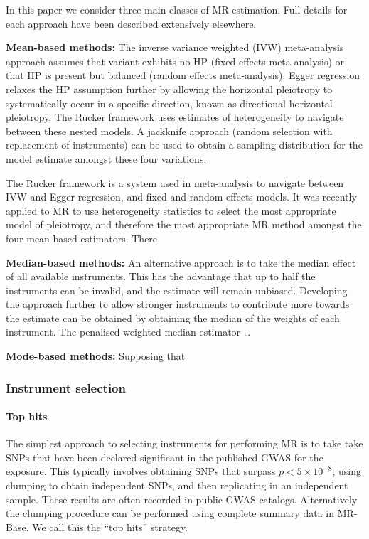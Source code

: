\documentclass[]{article}
\let\oldparagraph\paragraph
\renewcommand{\paragraph}[1]{\oldparagraph{#1}\mbox{}}
\begin{document}
In this paper we consider three main classes of MR estimation. Full
details for each approach have been described extensively elsewhere.

\textbf{Mean-based methods:} The inverse variance weighted (IVW)
meta-analysis approach assumes that variant exhibits no HP (fixed
effects meta-analysis) or that HP is present but balanced (random
effects meta-analysis). Egger regression relaxes the HP assumption
further by allowing the horizontal pleiotropy to systematically occur in
a specific direction, known as directional horizontal pleiotropy. The
Rucker framework uses estimates of heterogeneity to navigate between
these nested models. A jackknife approach (random selection with
replacement of instruments) can be used to obtain a sampling
distribution for the model estimate amongst these four variations.

The Rucker framework is a system used in meta-analysis to navigate
between IVW and Egger regression, and fixed and random effects models.
It was recently applied to MR to use heterogeneity statistics to select
the most appropriate model of pleiotropy, and therefore the most
appropriate MR method amongst the four mean-based estimators. There

\textbf{Median-based methods:} An alternative approach is to take the
median effect of all available instruments. This has the advantage that
up to half the instruments can be invalid, and the estimate will remain
unbiased. Developing the approach further to allow stronger instruments
to contribute more towards the estimate can be obtained by obtaining the
median of the weights of each instrument. The penalised weighted median
estimator \ldots{}

\textbf{Mode-based methods:} Supposing that

\subsubsection{Instrument selection}\label{instrument-selection}

\paragraph{Top hits}\label{top-hits}

The simplest approach to selecting instruments for performing MR is to
take take SNPs that have been declared significant in the published GWAS
for the exposure. This typically involves obtaining SNPs that surpass
\(p < 5 \times 10^{-8}\), using clumping to obtain independent SNPs, and
then replicating in an independent sample. These results are often
recorded in public GWAS catalogs. Alternatively the clumping procedure
can be performed using complete summary data in MR-Base. We call this
the ``top hits'' strategy.
\end{document}
